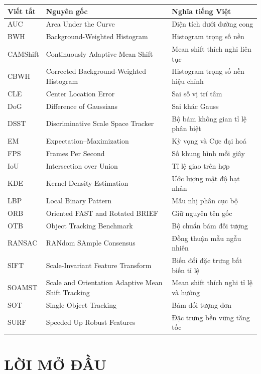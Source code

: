 \documentclass[12pt,a4paper]{article}
\numberwithin{equation}{section}
\begin{document}
\begin{table}[H]
\centering
\small
\begin{tabularx}{\textwidth}{@{}l l X@{}}
\toprule
\textbf{Viết tắt} & \textbf{Nguyên gốc} & \textbf{Nghĩa tiếng Việt} \\
\midrule
AUC & Area Under the Curve & Diện tích dưới đường cong \\
BWH & Background-Weighted Histogram & Histogram trọng số nền \\
CAMShift & Continuously Adaptive Mean Shift & Mean shift thích nghi liên tục \\
CBWH & Corrected Background-Weighted Histogram & Histogram trọng số nền hiệu chỉnh \\
CLE & Center Location Error & Sai số vị trí tâm \\
DoG & Difference of Gaussians & Sai khác Gauss \\
DSST & Discriminative Scale Space Tracker & Bộ bám không gian tỉ lệ phân biệt \\
EM & Expectation--Maximization & Kỳ vọng và Cực đại hoá \\
FPS & Frames Per Second & Số khung hình mỗi giây \\
IoU & Intersection over Union & Tỉ lệ giao trên hợp \\
KDE & Kernel Density Estimation & Ước lượng mật độ hạt nhân \\
LBP & Local Binary Pattern & Mẫu nhị phân cục bộ \\
ORB & Oriented FAST and Rotated BRIEF & Giữ nguyên tên gốc \\
OTB & Object Tracking Benchmark & Bộ chuẩn bám đối tượng \\
RANSAC & RANdom SAmple Consensus & Đồng thuận mẫu ngẫu nhiên \\
SIFT & Scale-Invariant Feature Transform & Biến đổi đặc trưng bất biến tỉ lệ \\
SOAMST & Scale and Orientation Adaptive Mean Shift Tracking & Mean shift thích nghi tỉ lệ và hướng \\
SOT & Single Object Tracking & Bám đối tượng đơn \\
SURF & Speeded Up Robust Features & Đặc trưng bền vững tăng tốc \\
\bottomrule
\end{tabularx}
\end{table}
\clearpage

\section*{LỜI MỞ ĐẦU}
\end{document}
